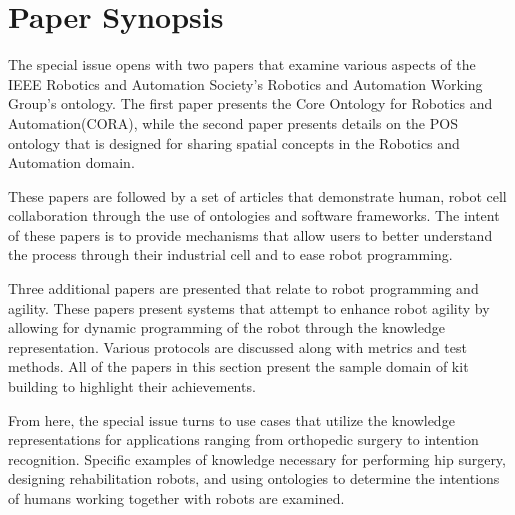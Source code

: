 \section{Paper Synopsis}
The special issue opens with two papers that examine various aspects of the IEEE Robotics 
and Automation Society's Robotics and Automation Working Group's ontology. The first paper
presents the Core Ontology for Robotics and Automation(CORA), while the second paper presents
details on the POS ontology that is designed for sharing spatial concepts in the Robotics 
and Automation domain.

These papers are followed by a set of articles that demonstrate human, robot cell collaboration
through the use of ontologies and software frameworks. The  intent of these papers is to 
provide mechanisms that allow users to better understand the process through their industrial
cell and to ease robot programming.

Three additional papers are presented that relate to robot programming and agility. These
papers present systems that attempt to enhance robot agility by allowing for dynamic
programming of the robot through the knowledge representation. Various protocols are
discussed along with metrics and test methods.  All of the papers in this section present
the sample domain of kit building to highlight their achievements.

From here, the special issue turns to use cases that utilize the knowledge representations for 
applications ranging from orthopedic surgery to intention recognition. Specific examples
of knowledge necessary for performing hip surgery, designing rehabilitation robots, and
using ontologies to determine the intentions of humans working together with robots
are examined.
